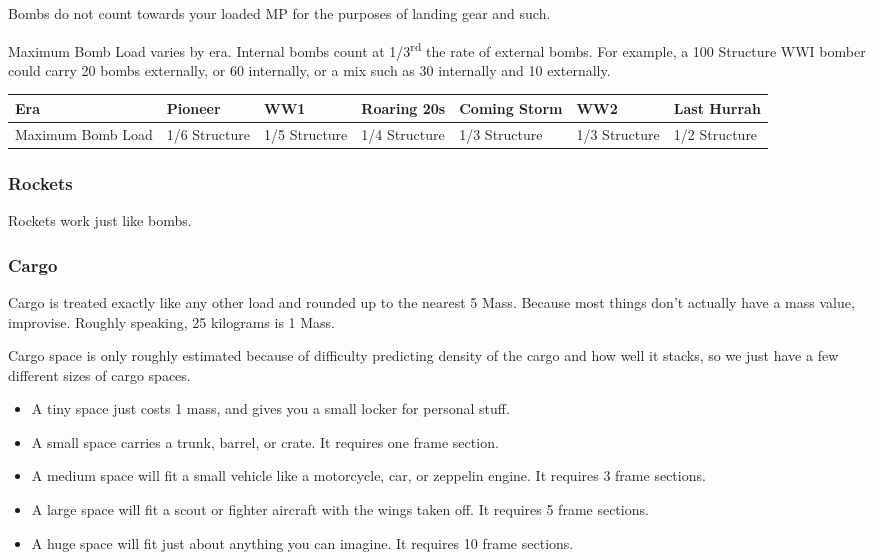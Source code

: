 \documentclass{article}
\begin{document}
Bombs do not count towards your loaded MP for the purposes of landing
gear and such.

Maximum Bomb Load varies by era. Internal bombs count at
1/3\textsuperscript{rd} the rate of external bombs. For example, a 100
Structure WWI bomber could carry 20 bombs externally, or 60 internally,
or a mix such as 30 internally and 10 externally.

\begin{tabular}{|l|l|l|l|l|l|l|}
    \hline
    Era               & Pioneer       & WW1           & Roaring 20s   & Coming Storm & WW2 & Last Hurrah \\\hline
    Maximum Bomb Load & 1/6 Structure & 1/5 Structure & 1/4 Structure & 1/3
    Structure         & 1/3 Structure & 1/2 Structure                                                    \\\hline
\end{tabular}

\subsubsection{Rockets}
\label{_Rockets}

Rockets work just like bombs.

\subsubsection{Cargo}
\label{_Cargo}

Cargo is treated exactly like any other load and rounded up to the
nearest 5 Mass. Because most things don't actually have a mass value,
improvise. Roughly speaking, 25 kilograms is 1 Mass.

Cargo space is only roughly estimated because of difficulty predicting
density of the cargo and how well it stacks, so we just have a few
different sizes of cargo spaces.

\begin{itemize}
    \item          A tiny space just costs 1 mass, and gives you a small locker
          for personal stuff.
    \item          A small space carries a trunk, barrel, or crate. It requires
          one frame section.
    \item          A medium space will fit a small vehicle like a motorcycle, car,
          or zeppelin engine. It requires 3 frame sections.
    \item          A large space will fit a scout or fighter aircraft with the
          wings taken off. It requires 5 frame sections.
    \item          A huge space will fit just about anything you can imagine. It
          requires 10 frame sections.
\end{itemize}
\end{document}

